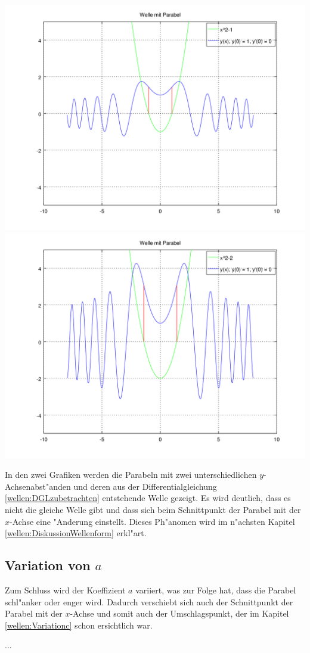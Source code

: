 \noindent
\includegraphics[scale=0.35]{./wellen/images/varc/cneg1.png}
\includegraphics[scale=0.35]{./wellen/images/varc/cneg2.png}

In den zwei Grafiken werden die 
Parabeln mit zwei unterschiedlichen $y$-Achsenabst"anden und deren aus der 
Differentialgleichung \ref{wellen:DGLzubetrachten} entstehende Welle gezeigt. 
Es wird deutlich, dass es nicht die gleiche Welle gibt und dass sich beim 
Schnittpunkt der Parabel mit der $x$-Achse eine "Anderung einstellt. Dieses 
Ph"anomen wird im n"achsten Kapitel \ref{wellen:DiskussionWellenform} erkl"art. 

\subsection{Variation von $a$}
\label{wellen:Variationa}

Zum Schluss wird der Koeffizient $a$ variiert, was zur Folge hat, dass die 
Parabel schl"anker oder enger wird. Dadurch verschiebt sich auch der 
Schnittpunkt der Parabel mit der $x$-Achse und somit auch der Umschlagspunkt, 
der im Kapitel \ref{wellen:Variationc} schon ersichtlich war. 

...